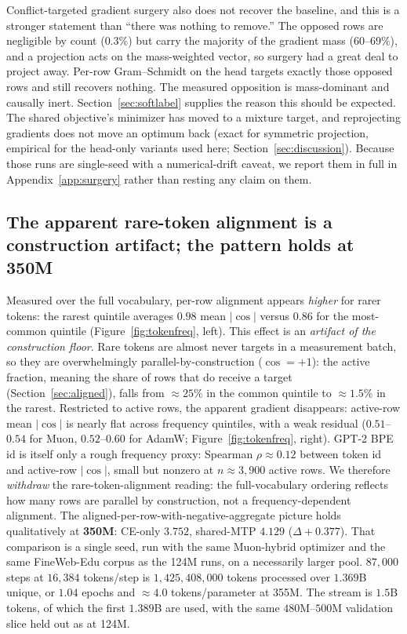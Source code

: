 Conflict-targeted gradient surgery also does not recover the baseline, and this
is a stronger statement than ``there was nothing to remove.'' The opposed rows are negligible by count ($0.3\%$) but carry the majority of the gradient mass ($60$--$69\%$), and a projection acts on the mass-weighted vector, so surgery had a great deal to project away. Per-row Gram--Schmidt on the head targets exactly those opposed rows and still recovers nothing. The measured opposition is
mass-dominant and causally inert. Section~\ref{sec:softlabel} supplies the reason this should be expected. The shared objective's minimizer has moved to a mixture target, and reprojecting gradients does not move an optimum back (exact for symmetric projection, empirical for the head-only variants used here; Section~\ref{sec:discussion}). Because those runs
are single-seed with a
numerical-drift caveat, we report them in full in Appendix~\ref{app:surgery}
rather than resting any claim on them.

\subsection{The apparent rare-token alignment is a construction artifact; the pattern holds at 350M}
\label{sec:rare}
Measured over the full vocabulary, per-row alignment appears \emph{higher} for
rarer tokens: the rarest quintile averages $0.98$ mean $|\cos|$ versus $0.86$
for the most-common quintile (Figure~\ref{fig:tokenfreq}, left). This effect is
an \emph{artifact of the construction floor}. Rare tokens are almost never
targets in a measurement batch, so they are overwhelmingly parallel-by-construction
($\cos=+1$): the active fraction, meaning the share of rows that do receive a target (Section~\ref{sec:aligned}), falls from ${\approx}25\%$ in the common quintile to ${\approx}1.5\%$ in the rarest. Restricted to active rows, the apparent
gradient disappears: active-row mean $|\cos|$ is nearly flat across
frequency quintiles, with a weak residual ($0.51$--$0.54$ for Muon, $0.52$--$0.60$ for AdamW;
Figure~\ref{fig:tokenfreq}, right). GPT-2 BPE id is itself only a rough frequency
proxy: Spearman
$\rho{\approx}0.12$ between token id and active-row $|\cos|$, small but nonzero at
$n{\approx}3{,}900$ active rows. We therefore
\emph{withdraw} the rare-token-alignment reading: the full-vocabulary ordering
reflects how many rows are parallel by construction, not a frequency-dependent
alignment. The
aligned-per-row-with-negative-aggregate picture holds qualitatively at
\textbf{350M}: CE-only $3.752$, shared-MTP $4.129$ ($\Delta{+}0.377$).
That comparison is a single seed, run with the same Muon-hybrid optimizer and the
same FineWeb-Edu corpus as the 124M runs, on a necessarily larger pool.
$87{,}000$ steps at $16{,}384$ tokens/step is $1{,}425{,}408{,}000$ tokens processed
over $1.369$B unique, or $1.04$ epochs and $\approx 4.0$ tokens/parameter at 355M.
The stream is $1.5$B tokens, of which the first $1.389$B are used, with the same
$480$M--$500$M validation slice held out as at 124M.

